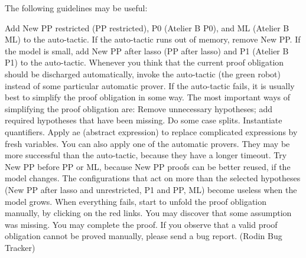 The following guidelines may be useful:

    Add New PP restricted (PP restricted), P0 (Atelier B P0), and ML (Atelier B ML) to the auto-tactic. If the auto-tactic runs out of memory, remove New PP.
    If the model is small, add New PP after lasso (PP after lasso) and P1 (Atelier B P1) to the auto-tactic.
    Whenever you think that the current proof obligation should be discharged automatically, invoke the auto-tactic (the green robot) instead of some particular automatic prover.
    If the auto-tactic fails, it is usually best to simplify the proof obligation in some way. The most important ways of simplifying the proof obligation are:
        Remove unnecessary hypotheses; add required hypotheses that have been missing.
        Do some case splits.
        Instantiate quantifiers.
        Apply ae (abstract expression) to replace complicated expressions by fresh variables. 
    You can also apply one of the automatic provers. They may be more successful than the auto-tactic, because they have a longer timeout.
        Try New PP before PP or ML, because New PP proofs can be better reused, if the model changes.
        The configurations that act on more than the selected hypotheses (New PP after lasso and unrestricted, P1 and PP, ML) become useless when the model grows. 
    When everything fails, start to unfold the proof obligation manually, by clicking on the red links.
        You may discover that some assumption was missing.
        You may complete the proof.
        If you observe that a valid proof obligation cannot be proved manually, please send a bug report. (Rodin Bug Tracker) 


